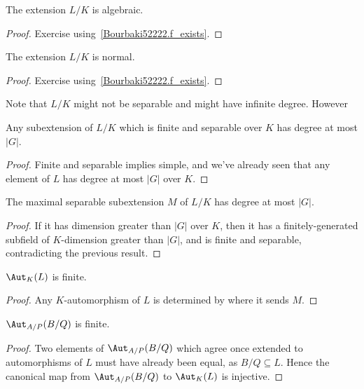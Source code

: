 \begin{corollary}
  \label{Bourbaki52222.algebraic}
  \leanok
  The extension $L/K$ is algebraic.
\end{corollary}
\begin{proof}
  \leanok
  Exercise using~\ref{Bourbaki52222.f_exists}.
\end{proof}

\begin{corollary}
  \leanok
  The extension $L/K$ is normal.
\end{corollary}
\begin{proof}
  \leanok
  Exercise using~\ref{Bourbaki52222.f_exists}.
\end{proof}

Note that $L/K$ might not be separable and might have infinite degree. However

\begin{corollary}
  \label{Bourbaki52222.finite_separable_subextension_finrank_le}
  Any subextension of $L/K$ which is finite and separable over $K$
  has degree at most $|G|$.
  \leanok
\end{corollary}
\begin{proof}
  \leanok
  Finite and separable implies simple, and we've already seen that any
  element of $L$ has degree at most $|G|$ over $K$.
\end{proof}

\begin{corollary}
  \label{Bourbaki52222.separableClosure_finrank_le}
  The maximal separable subextension $M$ of $L/K$ has degree at most $|G|$.
  \leanok
\end{corollary}
\begin{proof}
  \leanok
  If it has dimension greater than $|G|$ over $K$, then it has a finitely-generated
  subfield of $K$-dimension greater than $|G|$, and is finite and separable, contradicting
  the previous result.
\end{proof}

\begin{corollary} $\Aut_K(L)$ is finite.
  \leanok
\end{corollary}
\begin{proof}
  \leanok
  Any $K$-automorphism of $L$ is determined by where it sends $M$.
\end{proof}

\begin{corollary} $\Aut_{A/P}(B/Q)$ is finite.
  \leanok
\end{corollary}
\begin{proof}
  \leanok
  Two elements of $\Aut_{A/P}(B/Q)$ which agree once extended to automorphisms of $L$
  must have already been equal, as $B/Q\subseteq L$. Hence the canonical map
  from $\Aut_{A/P}(B/Q)$ to $\Aut_K(L)$ is injective.
\end{proof}

